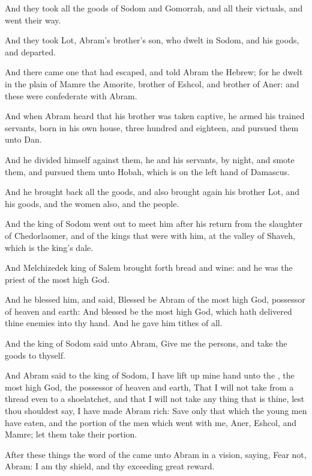 \Verse And they took all the goods of Sodom and Gomorrah, and all their victuals, and went their way.

\Verse And they took Lot, Abram's brother's son, who dwelt in Sodom, and his goods, and departed.

\Verse And there came one that had escaped, and told Abram the Hebrew; for he dwelt in the plain of Mamre the Amorite, brother of Eshcol, and brother of Aner: and these were confederate with Abram.

\Verse And when Abram heard that his brother was taken captive, he armed his trained servants, born in his own house, three hundred and eighteen, and pursued them unto Dan.

\Verse And he divided himself against them, he and his servants, by night, and smote them, and pursued them unto Hobah, which is on the left hand of Damascus.

\Verse And he brought back all the goods, and also brought again his brother Lot, and his goods, and the women also, and the people.

\Verse And the king of Sodom went out to meet him after his return from the slaughter of Chedorlaomer, and of the kings that were with him, at the valley of Shaveh, which is the king's dale.

\Verse And Melchizedek king of Salem brought forth bread and wine: and he was the priest of the most high God.

\Verse And he blessed him, and said, Blessed be Abram of the most high God, possessor of heaven and earth: \Verse And blessed be the most high God, which hath delivered thine enemies into thy hand. And he gave him tithes of all.

\Verse And the king of Sodom said unto Abram, Give me the persons, and take the goods to thyself.

\Verse And Abram said to the king of Sodom, I have lift up mine hand unto the \LORD, the most high God, the possessor of heaven and earth, \Verse That I will not take from a thread even to a shoelatchet, and that I will not take any thing that is thine, lest thou shouldest say, I have made Abram rich: \Verse Save only that which the young men have eaten, and the portion of the men which went with me, Aner, Eshcol, and Mamre; let them take their portion.

\Chapter
\Verse After these things the word of the \LORD came unto Abram in a vision, saying, Fear not, Abram: I am thy shield, and thy exceeding great reward.


